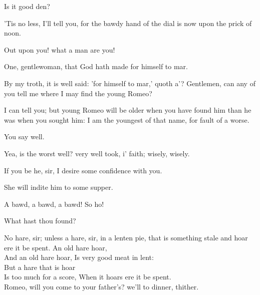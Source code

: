 \begin{speech}
Is it good den?
\end{speech}
\begin{speech}
'Tis no less, I'll tell you, for the
bawdy hand of the dial is now upon the prick
of noon.
\end{speech}
\begin{speech}
Out upon you! what a man are
you!
\end{speech}
\begin{speech}
One, gentlewoman, that God hath
made for himself to mar.
\end{speech}
\begin{speech}
By my troth, it is well said: 'for
himself to mar,' quoth a'?   Gentlemen, can
any of you tell me where I may find the young
Romeo?
\end{speech}
\begin{speech}
I can tell you; but young Romeo
 will be older when you have found him than
 he was when you sought him:  I am the
 youngest of that name, for fault of a worse.
\end{speech}
\begin{speech}
You say well.
\end{speech}
\begin{speech}
Yea, is the worst well? very well
 took, i' faith; wisely, wisely.
\end{speech}
\begin{speech}
If you be he, sir, I desire some confidence
with you.
\end{speech}
\begin{speech}
She will indite him to some supper.
\end{speech}
\begin{speech}
A bawd, a bawd, a bawd!   So ho!
\end{speech}
\begin{speech}
What hast thou found?
\end{speech}
\begin{speech}
No hare, sir; unless a hare, sir, in a
lenten pie, that is something stale and hoar ere
it be spent. An old hare hoar, \\
And an old hare hoar, Is very good meat in lent: \\
But a hare that is hoar \\
Is too much for a score, When it hoars ere it be spent. \\
Romeo, will you come to your father's? we'll
to dinner, thither.
\end{speech}

